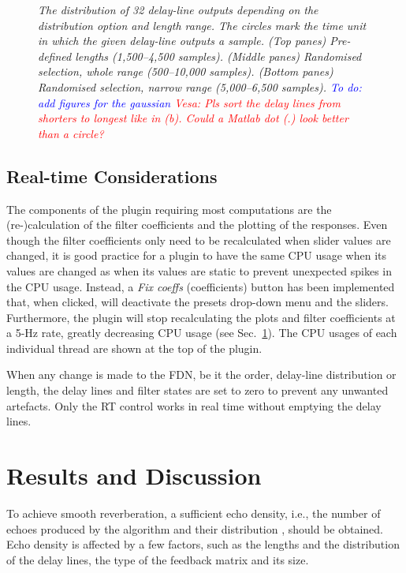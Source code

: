 \documentclass[twoside,a4paper]{article}
\newcommand{\karolina}[1]{\textcolor{blue}{#1}}
\newcommand{\vesa}[1]{\textcolor{red}{Vesa: #1}}
\begin{document}
\begin{figure}[t!]
    \caption{\textit{The distribution of 32 delay-line outputs depending on the distribution option and length range. The circles mark the time unit in which the given delay-line outputs a sample. (Top panes) Pre-defined lengths (1,500--4,500 samples). (Middle panes) Randomised selection, whole range (500--10,000 samples). (Bottom panes) Randomised selection, narrow range (5,000--6,500 samples). \karolina{To do: add figures for the gaussian}
    \vesa{Pls sort the delay lines from shorters to longest like in (b). Could a Matlab dot (.) look better than a circle?}}}
    \label{fig:dLens}
\end{figure}

\subsection{Real-time Considerations}
The components of the plugin requiring most computations are the (re-)calculation of the filter coefficients and the plotting of the responses. Even though the filter coefficients only need to be recalculated when slider values are changed, it is good practice for a plugin to have the same CPU usage when its values are changed as when its values are static to prevent unexpected spikes in the CPU usage. Instead, a \textit{Fix coeffs} (coefficients) button has been implemented that, when clicked, will deactivate the presets drop-down menu and the sliders. Furthermore, the plugin will stop recalculating the plots and filter coefficients at a 5-Hz rate, greatly decreasing CPU usage (see Sec.~\ref{sec:resDisc}). The CPU usages of each individual thread are shown at the top of the plugin.

When any change is made to the FDN, be it the order, delay-line distribution or length, the delay lines and filter states are set to zero to prevent any unwanted artefacts. Only the RT control works in real time without emptying the delay lines.

\section{Results and Discussion}\label{sec:resDisc}
To achieve smooth reverberation, a sufficient echo density, i.e., the number of echoes produced by the algorithm and their distribution \cite{schlecht:2016:echo}, should be obtained. Echo density is affected by a few factors, such as the lengths and the distribution of the delay lines, the type of the feedback matrix and its size. 
\end{document}
